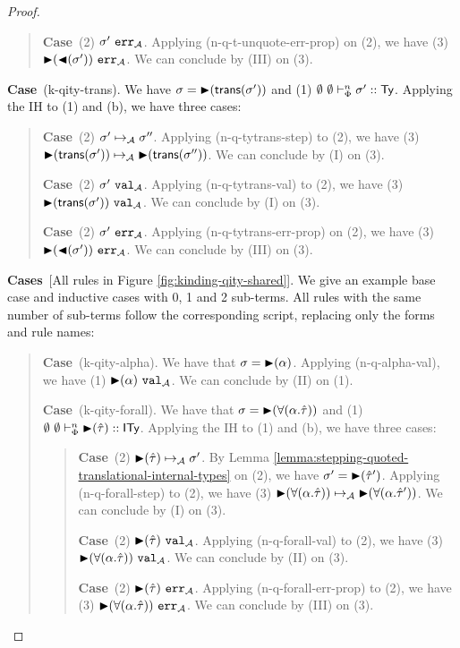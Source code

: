 \documentclass[12pt]{article}
\newcommand{\pfcase}[1]{\textbf{Case}~#1. }
\newcommand{\pfcases}[1]{\textbf{Cases}~#1. }
\begin{document}
\begin{proof}
\begin{quote}
    \pfcase{(2) $\sigma'~\mathtt{err}_{\mathcal{A}}$} Applying (n-q-t-unquote-err-prop) on (2), we have (3) ${\blacktriangleright}({\blacktriangleleft}(\sigma'))~\mathtt{err}_{\mathcal{A}}$. We can conclude by (III) on (3).
\end{quote}

\pfcase{(k-qity-trans)} We have $\sigma={\blacktriangleright}({\sf trans}(\sigma'))$ and (1) $\emptyset~\emptyset \vdash_{\Phi}^{n} \sigma' :: {\sf Ty}$. Applying the IH to (1) and (b), we have three cases:

\begin{quote}
    \pfcase{(2) $\sigma' \mapsto_{\mathcal{A}} \sigma''$} Applying (n-q-tytrans-step) to (2), we have (3) ${\blacktriangleright}({\sf trans}(\sigma')) \mapsto_{\mathcal{A}} {\blacktriangleright}({\sf trans}(\sigma''))$. We can conclude by (I) on (3).

    \pfcase{(2) $\sigma'~\mathtt{val}_{\mathcal{A}}$} Applying (n-q-tytrans-val) to (2), we have (3) ${\blacktriangleright}({\sf trans}(\sigma'))~\mathtt{val}_{\mathcal{A}}$. We can conclude by (I) on (3).

    \pfcase{(2) $\sigma'~\mathtt{err}_{\mathcal{A}}$} Applying (n-q-tytrans-err-prop) on (2), we have (3) ${\blacktriangleright}({\blacktriangleleft}(\sigma'))~\mathtt{err}_{\mathcal{A}}$. We can conclude by (III) on (3).
\end{quote}

\pfcases{[All rules in Figure \ref{fig:kinding-qity-shared}]} We give an example base case and inductive cases with 0, 1 and 2 sub-terms. All rules with the same number of sub-terms follow the corresponding script, replacing only the forms and rule names:

\begin{quote}
    \pfcase{(k-qity-alpha)} We have that $\sigma={\blacktriangleright}(\alpha)$. Applying (n-q-alpha-val), we have (1) ${\blacktriangleright}(\alpha)~\mathtt{val}_{\mathcal{A}}$. We can conclude by (II) on (1).

    \pfcase{(k-qity-forall)} We have that $\sigma={\blacktriangleright}(\forall(\alpha.\hat{\tau}))$ and (1) $\emptyset~\emptyset \vdash_{\Phi}^{n} {\blacktriangleright}(\hat{\tau}) :: {\sf ITy}$. Applying the IH to (1) and (b), we have three cases:

    \begin{quote}
        \pfcase{(2) ${\blacktriangleright}(\hat{\tau}) \mapsto_{\mathcal{A}} \sigma'$} By Lemma \ref{lemma:stepping-quoted-translational-internal-types} on (2), we have $\sigma'={\blacktriangleright}(\hat{\tau}')$. Applying (n-q-forall-step) to (2), we have (3) ${\blacktriangleright}(\forall(\alpha.\hat{\tau})) \mapsto_{\mathcal{A}} {\blacktriangleright}(\forall(\alpha.\hat{\tau}'))$. We can conclude by (I) on (3).

        \pfcase{(2) ${\blacktriangleright}(\hat{\tau})~\mathtt{val}_{\mathcal{A}}$} Applying (n-q-forall-val) to (2), we have (3) ${\blacktriangleright}(\forall(\alpha.\hat{\tau}))~\mathtt{val}_{\mathcal{A}}$. We can conclude by (II) on (3).

        \pfcase{(2) ${\blacktriangleright}(\hat{\tau})~\mathtt{err}_{\mathcal{A}}$} Applying (n-q-forall-err-prop) to (2), we have (3) ${\blacktriangleright}(\forall(\alpha.\hat{\tau}))~\mathtt{err}_{\mathcal{A}}$. We can conclude by (III) on (3).
    \end{quote}


\end{quote}
\end{proof}
\end{document}
